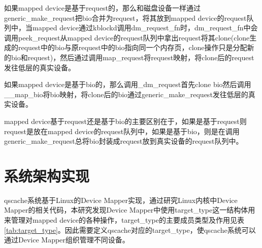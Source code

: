 如果mapped device是基于request的，那么和磁盘设备一样通过generic\_make\_request把bio合并为request，将其放到mapped device的request队列中，当mapped device通过kblockd调用dm\_request\_fn时，dm\_request\_fn中会调用peek\_request从mapped device的request队列中拿出request将其clone(clone生成的request中的bio与原request中的bio指向同一个内存页，clone操作只是分配新的bio和request)，然后通过调用map\_request将request映射，将clone后的request发往低层的真实设备。

如果mapped device是基于bio的，那么调用\_dm\_request首先clone bio然后调用\_\_map\_bio将bio映射，将clone后的bio通过generic\_make\_request发往低层的真实设备。

mapped device基于request还是基于bio的主要区别在于，如果是基于request则request是放在mapped device的request队列中，如果是基于bio，则是在调用generic\_make\_request总将bio封装成request放到真实设备的request队列中。

\section{系统架构实现}

qscache系统基于Linux的Device Mapper实现，通过研究Linux内核中Device Mapper的相关代码，本研究发现Device Mapper中使用target\_type这一结构体用来管理对mapped device的各种操作，target\_type的主要成员类型及作用见表\ref{tab:target_type}。因此需要定义qscache对应的target\_type，使qscache系统可以通过Device Mapper组织管理不同设备。

